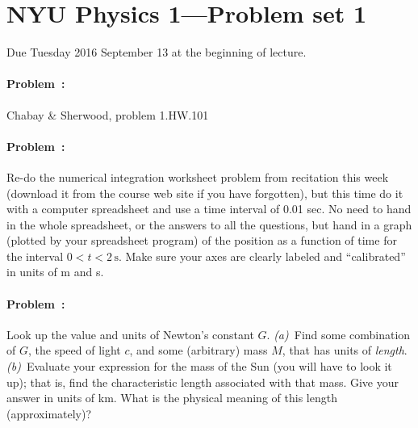 \documentclass[12pt]{article}
\newcommand{\s}{\mathrm{s}}
\begin{document}
\thispagestyle{empty}

\section*{NYU Physics 1---Problem set 1}

Due Tuesday 2016 September 13 at the beginning of lecture.

\paragraph{Problem~\theproblem:}%
Chabay \& Sherwood, problem 1.HW.101

\paragraph{Problem~\theproblem:}%
Re-do the numerical integration worksheet problem from recitation this
week (download it from the course web site if you have forgotten), but
this time do it with a computer spreadsheet and use a time interval of
0.01 sec.  No need to hand in the whole spreadsheet, or the answers to
all the questions, but hand in a graph (plotted by your spreadsheet
program) of the position as a function of time for the interval
$0<t<2\,\s$.  Make sure your axes are clearly labeled and
``calibrated'' in units of m and s.

\paragraph{Problem~\theproblem:}%
Look up the value and units of Newton's constant $G$.
\textsl{(a)}~Find some combination of $G$, the speed of light $c$, and
some (arbitrary) mass $M$, that has units of \emph{length}.
\textsl{(b)}~Evaluate your expression for the mass of the Sun (you
will have to look it up); that is, find the characteristic length
associated with that mass.  Give your answer in units of km.  What is
the physical meaning of this length (approximately)?
\end{document}
